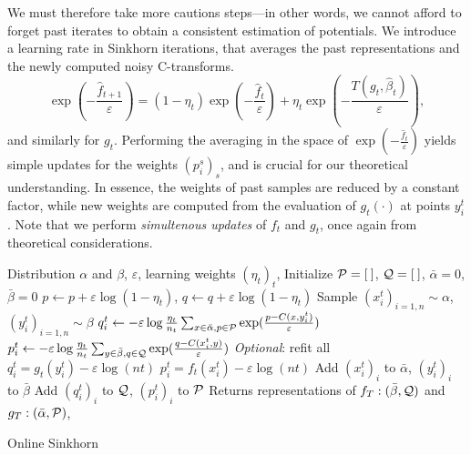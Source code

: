 We must therefore take more cautions steps---in other words,
we cannot afford to forget past iterates to obtain a consistent estimation of
potentials. We introduce a learning rate in Sinkhorn iterations, that averages
the past representations and the newly computed noisy C-transforms.
\begin{equation}\label{eq:updates}
    \exp(-\frac{\hat f_{t+1}}
    {\varepsilon}) = (1 - \eta_t) \exp(-\frac{\hat f_t}{\varepsilon}) 
    + \eta_t 
    \exp(-\frac{T(g_t, \hat \beta_t)}{\varepsilon}),
\end{equation}
and similarly for $g_t$. Performing the averaging in the space of
$\exp(-\frac{\hat f_{t}}{\varepsilon})$ yields simple updates for the weights
${(p_i^s)}_s$, and is crucial for our theoretical understanding. In essence, the
weights of past samples are reduced by a constant factor, while new weights are
computed from the evaluation of $g_t(\cdot)$ at points $y_i^t$. Note that we
perform \textit{simultenous updates} of $f_t$ and $g_t$, once again from
theoretical considerations.

\begin{algorithm}[t]
    \begin{algorithmic}
    \Input Distribution $\alpha$ and $\beta$, $\varepsilon$, learning weights ${(\eta_t)}_t$,
    \State Initialize $\mathcal{P} = [\:]$, $\mathcal{Q} = [\:]$, $\bar \alpha = 0$, $\bar \beta = 0$
            \State $p \gets p + \varepsilon \log(1 - \eta_t)$,
             \State $q \gets q + \varepsilon \log(1 - \eta_t)$
        \EndFor
        \State Sample $(x_i^t)_{i=1,n} \sim \alpha$, $(y_i^t)_{i=1,n} \sim \beta$
            \State $q_i^t \gets 
            - \varepsilon \log \frac{\eta_t}{n_t} 
            \sum_{x \in \bar \alpha, p \in \mathcal{P}} \exp(\frac{p - C(x, y_i^t)}{\varepsilon})$
            \State $p_i^t \gets 
            - \varepsilon \log \frac{\eta_t}{n_t} 
            \sum_{y \in \bar \beta, q \in \mathcal{Q}} \exp(\frac{q - C(x_i^t, y)}{\varepsilon})$
        \EndFor
        \State \textit{Optional}: refit all $q_i^t = g_t(y_i^t) - \varepsilon \log (nt)$
        \State\hspace{2.45cm} $p_i^t = f_t(x_i^t) - \varepsilon \log (nt)$
        \State Add ${(x_i^t)}_i$ to $\bar \alpha$, ${(y_i^t)}_i$ to $\bar \beta$
        \State Add $(q_i^t)_i$ to $\mathcal{Q}$, $(p_i^t)_i$ to $\mathcal{P}$
    \EndFor
    \State Returns representations of $f_T: (\bar \beta, \mathcal{Q})$ and $g_T: (\bar \alpha, \mathcal{P})$, 
    \end{algorithmic}
    \caption{Online Sinkhorn}\label{alg:online_sinkhorn}
\end{algorithm}

